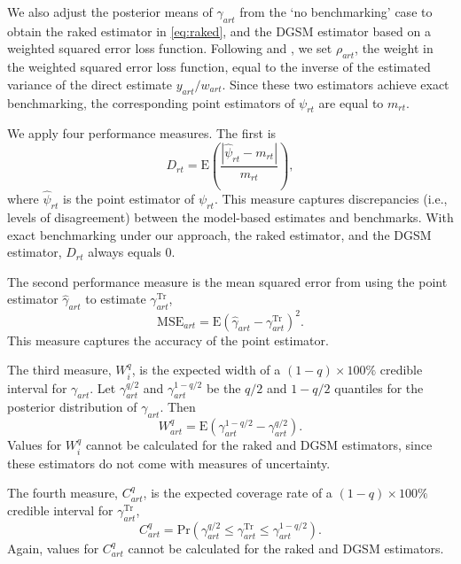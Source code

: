 \documentclass[12pt]{article}
\begin{document}
We also adjust the posterior means of $\gamma_{art}$ from the `no benchmarking' case to obtain the raked estimator in \eqref{eq:raked}, and the DGSM estimator based on a weighted squared error loss function. Following \citet[][p. 580]{datta2011bayesian} and \citet{wang2008small}, we set $\rho_{art}$, the weight in the weighted squared error loss function, equal to the inverse of the estimated variance of the direct estimate $y_{art}/w_{art}$.  Since these two estimators achieve exact benchmarking, the corresponding point estimators of $\psi_{rt}$ are equal to $m_{rt}$.

We apply four performance measures.  The first is
\begin{equation}
  D_{rt} =  \text{E}\left( \frac{ | \hat{\psi}_{rt} - m_{rt} | }{ m_{rt} }\right),  \label{eq:defn_agree}
\end{equation}
where $\hat{\psi}_{rt}$ is the point estimator of $\psi_{rt}$. This measure captures discrepancies (i.e., levels of disagreement) between the model-based estimates and benchmarks.  With exact benchmarking under our approach, the raked estimator, and the DGSM estimator, $D_{rt}$ always equals 0.

The second performance measure is the mean squared error from using the point estimator $\hat{\gamma}_{art}$ to estimate $\gamma_{art}^{\text{Tr}}$,
\begin{equation}
  \text{MSE}_{art} = \text{E} \left( \hat{\gamma}_{art} - \gamma_{art}^{\text{Tr}} \right)^2.\label{eq:defn_mse}
\end{equation}
This measure captures the accuracy of the point estimator.

The third measure, $W_{i}^q$, is the expected width of a $(1-q) \times 100\%$ credible interval for $\gamma_{art}$.  Let $\gamma_{art}^{q/2}$ and $\gamma_{art}^{1-q/2}$ be the $q/2$ and $1-q/2$ quantiles for the posterior distribution of $\gamma_{art}$. Then
\begin{equation}
  W_{art}^q = \text{E} \left( \gamma_{art}^{1-q/2} - \gamma_{art}^{q/2} \right). \label{eq:defn_CIwidth}
\end{equation}
Values for $W_{i}^q$ cannot be calculated for the raked and DGSM estimators, since these estimators do not come with measures of uncertainty.

The fourth measure, $C_{art}^q$, is the expected coverage rate of a $(1-q) \times 100\%$ credible interval for $\gamma_{art}^{\text{Tr}}$,
\begin{equation}
  C_{art}^q = \text{Pr} \left( \gamma_{art}^{q/2} \le \gamma_{art}^{\text{Tr}} \le \gamma_{art}^{1-q/2} \right).\label{eq:defn_CIcover}
\end{equation}
Again, values for $C_{art}^q$ cannot be calculated for the raked and DGSM estimators.
\end{document}
